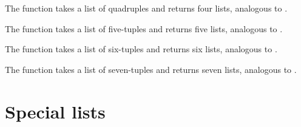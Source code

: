 \begin{haddockdesc}
\item[\begin{tabular}{@{}l}
unzip4 :: {\char 91}(a, b, c, d){\char 93} -> ({\char 91}a{\char 93}, {\char 91}b{\char 93}, {\char 91}c{\char 93}, {\char 91}d{\char 93})
\end{tabular}]
{\haddockbegindoc
The  function takes a list of quadruples and returns four
 lists, analogous to .\par}
\end{haddockdesc}
\begin{haddockdesc}
\item[\begin{tabular}{@{}l}
unzip5 :: {\char 91}(a, b, c, d, e){\char 93} -> ({\char 91}a{\char 93}, {\char 91}b{\char 93}, {\char 91}c{\char 93}, {\char 91}d{\char 93}, {\char 91}e{\char 93})
\end{tabular}]
{\haddockbegindoc
The  function takes a list of five-tuples and returns five
 lists, analogous to .\par}
\end{haddockdesc}
\begin{haddockdesc}
\item[\begin{tabular}{@{}l}
unzip6 :: {\char 91}(a, b, c, d, e, f){\char 93} -> ({\char 91}a{\char 93}, {\char 91}b{\char 93}, {\char 91}c{\char 93}, {\char 91}d{\char 93}, {\char 91}e{\char 93}, {\char 91}f{\char 93})
\end{tabular}]
{\haddockbegindoc
The  function takes a list of six-tuples and returns six
 lists, analogous to .\par}
\end{haddockdesc}
\begin{haddockdesc}
\item[\begin{tabular}{@{}l}
unzip7 :: {\char 91}(a, b, c, d, e, f, g){\char 93} -> ({\char 91}a{\char 93}, {\char 91}b{\char 93}, {\char 91}c{\char 93}, {\char 91}d{\char 93}, {\char 91}e{\char 93}, {\char 91}f{\char 93}, {\char 91}g{\char 93})
\end{tabular}]
{\haddockbegindoc
The  function takes a list of seven-tuples and returns
 seven lists, analogous to .\par}
\end{haddockdesc}
\section{Special lists}
